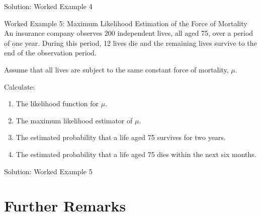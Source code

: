 \documentclass[
  ignorenonframetext,
  aspectratio=169,
]{beamer}
\providecommand{\tightlist}{%
  \setlength{\itemsep}{0pt}\setlength{\parskip}{0pt}}
\begin{document}
\begin{frame}{Solution: Worked Example 4}
\protect{}\label{solution-worked-example-4}
\end{frame}

\begin{frame}{Worked Example 5: Maximum Likelihood Estimation of the
Force of Mortality}
\protect{}\label{worked-example-5-maximum-likelihood-estimation-of-the-force-of-mortality}
An insurance company observes 200 independent lives, all aged 75, over a
period of one year. During this period, 12 lives die and the remaining
lives survive to the end of the observation period.

Assume that all lives are subject to the same constant force of
mortality, \(\mu\).

Calculate:

\begin{enumerate}
\tightlist
\item
  The likelihood function for \(\mu\).
\item
  The maximum likelihood estimator of \(\mu\).
\item
  The estimated probability that a life aged 75 survives for two years.
\item
  The estimated probability that a life aged 75 dies within the next six
  months.
\end{enumerate}
\end{frame}

\begin{frame}{Solution: Worked Example 5}
\protect{}\label{solution-worked-example-5}
\end{frame}

\section{Further Remarks}\label{further-remarks}
\end{document}
